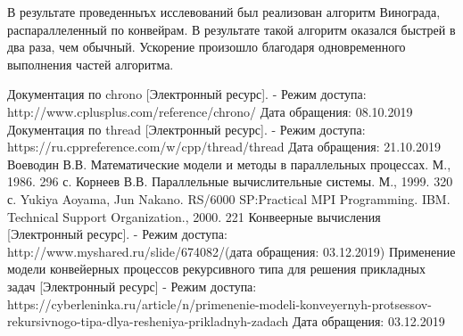 \documentclass[a4paper,12pt]{article}
\begin{document}
В результате проведенныъх исслевований был реализован алгоритм Винограда, распараллеленный
по конвейрам. В результате такой алгоритм оказался быстрей в два раза, чем обычный.
Ускорение произошло благодаря одновременного выполнения частей алгоритма.

\newpage
{}

\begin{thebibliography}{}
     Документация по chrono [Электронный ресурс]. -
    Режим доступа: http://www.cplusplus.com/reference/chrono/
    Дата обращения: 08.10.2019
     Документация по thread [Электронный ресурс]. -
    Режим доступа: https://ru.cppreference.com/w/cpp/thread/thread
    Дата обращения: 21.10.2019
     Воеводин В.В. Математические модели и методы в параллельных процессах. М., 1986. 296 с.
     Корнеев В.В. Параллельные вычислительные системы. М., 1999. 320 с.
     Yukiya Aoyama, Jun Nakano. RS/6000 SP:Practical MPI Programming. IBM. Technical Support Organization., 2000. 221
     Конвеерные вычисления [Электронный ресурс]. - Режим доступа: http://www.myshared.ru/slide/674082/(дата обращения: 03.12.2019)
     Применение модели конвейерных процессов рекурсивного типа для решения прикладных задач [Электронный ресурс] - Режим доступа: https://cyberleninka.ru/article/n/primenenie-modeli-konveyernyh-protsessov-rekursivnogo-tipa-dlya-resheniya-prikladnyh-zadach Дата обращения: 03.12.2019
\end{thebibliography}
\end{document}
